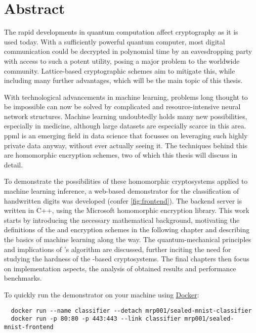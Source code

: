 \chapter*{Abstract}
The rapid developments in quantum computation affect cryptography as it is used today.
With a sufficiently powerful quantum computer, most digital communication could be decrypted in polynomial time by an eavesdropping party with access to such a potent utility, posing a major problem to the worldwide community.
Lattice-based cryptographic schemes aim to mitigate this, while including many further advantages, which will be the main topic of this thesis.

With technological advancements in machine learning, problems long thought to be impossible can now be solved by complicated and resource-intensive neural network structures.
Machine learning undoubtedly holds many new possibilities, especially in medicine, although large datasets are especially scarce in this area.
\Gls{ppml} is an emerging field in data science that focusses on leveraging such highly private data anyway, without ever actually seeing it.
The techniques behind this are homomorphic encryption schemes, two of which this thesis will discuss in detail.

To demonstrate the possibilities of these homomorphic cryptosystems applied to machine learning inference, a web-based demonstrator for the classification of handwritten digits was developed (confer \cref{fig:frontend}).
The backend server is written in C++, using the Microsoft  homomorphic encryption library.
This work starts by introducing the necessary mathematical background, motivating the definitions of the  and  encryption schemes in the following chapter and describing the basics of machine learning along the way.
The quantum-mechanical principles and implications of 's algorithm are discussed, further inciting the need for studying the hardness of the -based cryptosystems.
The final chapters then focus on implementation aspects, the analysis of obtained results and performance benchmarks.

To quickly run the demonstrator on your machine using \href{https://www.docker.com/}{Docker}:
\begin{verbatim}
  docker run --name classifier --detach mrp001/sealed-mnist-classifier
  docker run -p 80:80 -p 443:443 --link classifier mrp001/sealed-mnist-frontend
\end{verbatim}

